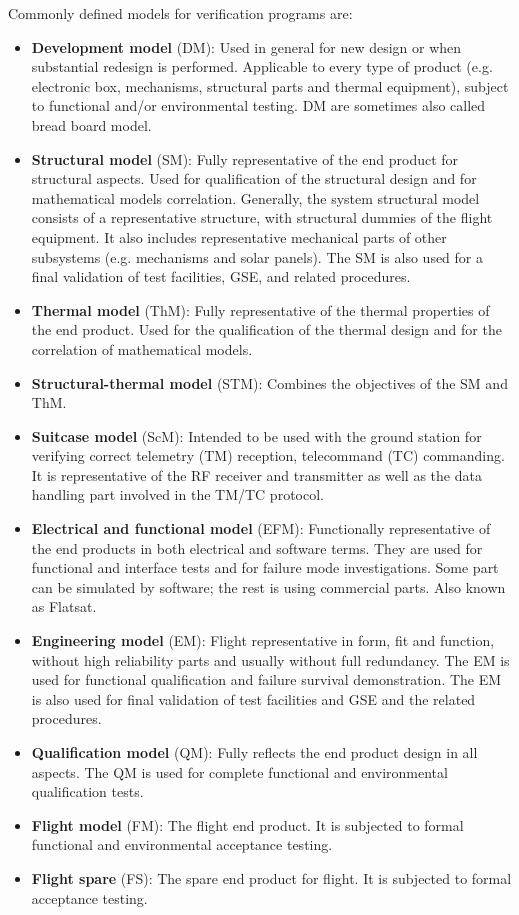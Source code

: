 Commonly defined models for verification programs are:

\begin{itemize}
\item \textbf{Development model} (DM): Used in general for new design or when substantial redesign is performed. Applicable to every type of product (e.g. electronic box, mechanisms, structural parts and thermal equipment), subject to functional and/or environmental testing. DM are sometimes also called bread board model.
\item \textbf{Structural model} (SM): Fully representative of the end product for structural aspects. Used for qualification of the structural design and for mathematical models correlation. Generally, the system structural model consists of a representative structure, with structural dummies of the flight equipment. It also includes representative mechanical parts of other subsystems (e.g. mechanisms and solar panels). The SM is also used for a final validation of test facilities, GSE, and related procedures.
\item \textbf{Thermal model} (ThM): Fully representative of the thermal properties of the end product. Used for the qualification of the thermal design and for the correlation of mathematical models. 
\item \textbf{Structural-thermal model} (STM): Combines the objectives of the SM and ThM.
\item \textbf{Suitcase model} (ScM): Intended to be used with the ground station for verifying correct telemetry (TM) reception, telecommand (TC) commanding. It is representative of the RF receiver and transmitter as well as the data handling part involved in the TM/TC protocol. 
\item \textbf{Electrical and functional model} (EFM): Functionally representative of the end products in both electrical and software terms. They are used for functional and interface tests and for failure mode investigations. Some part can be simulated by software; the rest is using commercial parts. Also known as Flatsat.
\item \textbf{Engineering model} (EM): Flight representative in form, fit and function, without high reliability parts and usually without full redundancy. The EM is used for functional qualification and failure survival demonstration. The EM is also used for final validation of test facilities and GSE and the related procedures.
\item \textbf{Qualification model} (QM): Fully reflects the end product design in all aspects. The QM is
used for complete functional and environmental qualification tests. 
\item \textbf{Flight model} (FM): The flight end product. It is subjected to formal functional and environmental acceptance testing. 
\item \textbf{Flight spare} (FS): The spare end product for flight. It is subjected to formal acceptance testing.
\end{itemize}

